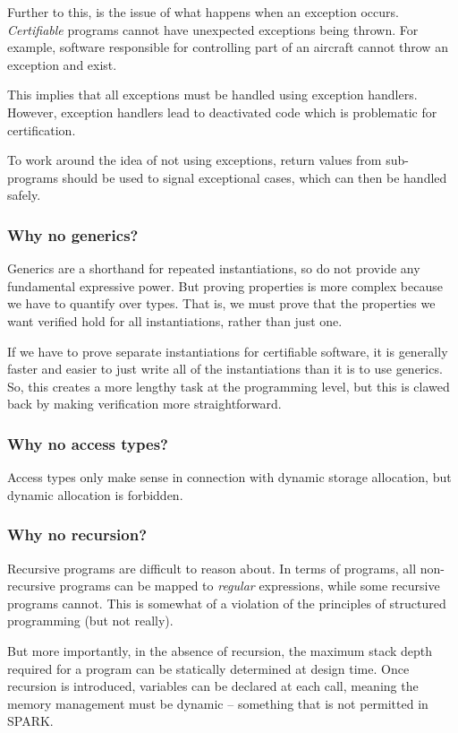 Further to this, is the issue of what happens when an exception occurs. {\em Certifiable} programs cannot have unexpected exceptions being thrown. For example, software responsible for controlling part of an aircraft cannot throw an exception and exist.

This implies that all exceptions must be handled using exception handlers. However, exception handlers lead to deactivated code which is problematic for certification.

To work around the idea of not using exceptions, return values from sub-programs should be used to signal exceptional cases, which can then be handled safely.


\subsubsection*{Why no generics?}

Generics are a shorthand for repeated instantiations, so do not provide any fundamental expressive power. But proving properties is more complex because we have to quantify over types. That is, we must prove that the properties we want verified hold for all instantiations, rather than just one.

If we have to prove separate instantiations for certifiable software, it is generally faster and easier to just write all of the instantiations than it is to use generics. So, this creates a more lengthy task at the programming level, but this is clawed back by making verification more straightforward.


\subsubsection*{Why no access types?}

Access types only make sense in connection with dynamic storage allocation, but dynamic allocation is forbidden.

\subsubsection{Why no recursion?}

Recursive programs are difficult to reason about. In terms of programs, all non-recursive programs can be mapped to {\em regular} expressions, while some recursive programs cannot. This is somewhat of a violation of the principles of structured programming (but not really).

But more importantly, in the absence of recursion, the maximum stack depth required for a program can be statically determined at design time. Once recursion is introduced, variables can be declared at each call, meaning the memory management must be dynamic -- something that is not permitted in SPARK.

